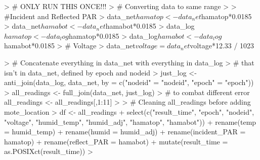 \documentclass[11pt]{article}
\begin{document}
\begin{enumerate}[label=(\alph*)]
\begin{Schunk}
\begin{Sinput}
> # ONLY RUN THIS ONCE!!!
> # Converting data to same range
> 
> #Incident and Reflected PAR
> data_net$hamatop <- data_net$hamatop*0.0185
> data_net$hamabot <- data_net$hamabot*0.0185
> data_log$hamatop <- data_log$hamatop*0.0185
> data_log$hamabot <- data_log$hamabot*0.0185
> # Voltage
> data_net$voltage = data_net$voltage*12.33 / 1023
\end{Sinput}
\end{Schunk}

\begin{Schunk}
\begin{Sinput}
> # Concatenate everything in data_net with everything in data_log
> # that isn't in data_net, defined by epoch and nodeid
> just_log <- anti_join(data_log, data_net, by = c("nodeid" = "nodeid", "epoch" = "epoch"))
> all_readings <- full_join(data_net, just_log)
> # to combat different error all_readings <- all_readings[,1:11]
> 
> # Cleaning all_readings before adding mote_location
> df <- all_readings %
+   select(c("result_time", "epoch", "nodeid", "voltage", "humid_temp", "humid_adj", "hamatop", "hamabot")) %
+   rename(temp = humid_temp) %
+   rename(humid = humid_adj) %
+   rename(incident_PAR = hamatop) %
+   rename(reflect_PAR = hamabot) %
+   mutate(result_time = as.POSIXct(result_time))
> 
\end{Sinput}
\end{Schunk}


\end{enumerate}
\end{document}
